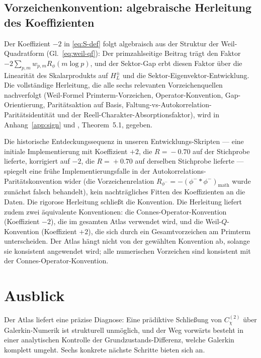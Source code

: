 \documentclass[a4paper,10pt,twocolumn]{article}
\theoremstyle{definition}
\theoremstyle{remark}
\newcommand{\chifn}{\chi}
\begin{document}
\subsection{Vorzeichenkonvention: algebraische Herleitung des Koeffizienten}
\label{sec:discussion-sign}

Der Koeffizient $-2$ in \eqref{eq:S-def} folgt algebraisch aus der
Struktur der Weil-Quadratform (Gl.~\eqref{eq:weil-qf}): Der primzahlseitige
Beitrag trägt den Faktor $-2\sum_{p,m}w_{p,m}R_\phi(m\log p)$, und der
Sektor-Gap erbt diesen Faktor über die Linearität des Skalarprodukts auf
$H_L^\pm$ und die Sektor-Eigenvektor-Entwicklung. Die vollständige Herleitung,
die alle sechs relevanten Vorzeichenquellen nachverfolgt
(Weil-Formel Primterm-Vorzeichen, Operator-Konvention,
Gap-Orientierung, Paritätsaktion auf Basis, Faltung-vs-Autokorrelation-
Paritätsidentität und der Reell-Charakter-Absorptionsfaktor), wird in
Anhang~\ref{app:sign} und \cite{AnalyticKernelV2}, Theorem~5.1, gegeben.

Die historische Entdeckungssequenz in unseren Entwicklungs-Skripten ---
eine initiale Implementierung mit Koeffizient $+2$, die $R\!=\!-0.70$ auf
der Stichprobe lieferte, korrigiert auf $-2$, die $R\!=\!+0.70$ auf
derselben Stichprobe lieferte --- spiegelt eine frühe Implementierungsfalle
in der Autokorrelations-Paritätskonvention wider (die Vorzeichenrelation
$R_{\phi^-}=-(\phi^-{*}\phi^-)_{\mathrm{math}}$ wurde zunächst falsch
behandelt), kein nachträgliches Fitten des Koeffizienten an die Daten.
Die rigorose Herleitung schließt die Konvention. Die Herleitung liefert
zudem zwei äquivalente Konventionen: die Connes-Operator-Konvention
(Koeffizient $-2$), die im gesamten Atlas verwendet wird, und die
Weil-$Q$-Konvention (Koeffizient $+2$), die sich durch ein Gesamtvorzeichen
am Primterm unterscheiden. Der Atlas hängt nicht von der gewählten Konvention
ab, solange sie konsistent angewendet wird; alle numerischen Vorzeichen sind
konsistent mit der Connes-Operator-Konvention.

\section{Ausblick}
\label{sec:outlook}

Der Atlas liefert eine präzise Diagnose: Eine prädiktive Schließung von
$C^{(2)}_{\chifn}$ über Galerkin-Numerik ist strukturell
unmöglich, und der Weg vorwärts besteht in einer analytischen Kontrolle der
Grundzustands-Differenz, welche Galerkin komplett umgeht. Sechs
konkrete nächste Schritte bieten sich an.
\end{document}
